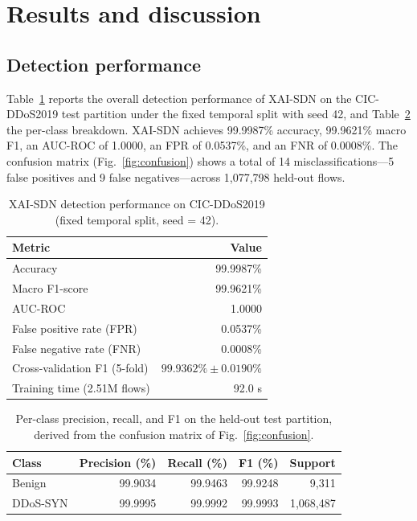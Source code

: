﻿\documentclass[review,12pt]{elsarticle}
\begin{document}
\section{Results and discussion}
\label{sec:results}

\subsection{Detection performance}
Table~\ref{tab:results} reports the overall detection performance of XAI-SDN on the CIC-DDoS2019 test partition under the fixed temporal split with seed 42, and Table~\ref{tab:perclass} the per-class breakdown. XAI-SDN achieves 99.9987\% accuracy, 99.9621\% macro F1, an AUC-ROC of 1.0000, an FPR of 0.0537\%, and an FNR of 0.0008\%. The confusion matrix (Fig.~\ref{fig:confusion}) shows a total of 14 misclassifications---5 false positives and 9 false negatives---across 1,077,798 held-out flows.

\begin{table}[!t]
\centering
\caption{XAI-SDN detection performance on CIC-DDoS2019 (fixed temporal split, seed = 42).}
\label{tab:results}
\begin{tabular}{@{}lr@{}}
\toprule
\textbf{Metric} & \textbf{Value} \\
\midrule
Accuracy & 99.9987\% \\
Macro F1-score & 99.9621\% \\
AUC-ROC & 1.0000 \\
False positive rate (FPR) & 0.0537\% \\
False negative rate (FNR) & 0.0008\% \\
Cross-validation F1 (5-fold) & $99.9362\% \pm 0.0190\%$ \\
Training time (2.51M flows) & 92.0 s \\
\bottomrule
\end{tabular}
\end{table}

\begin{table}[!t]
\centering
\caption{Per-class precision, recall, and F1 on the held-out test partition, derived from the confusion matrix of Fig.~\ref{fig:confusion}.}
\label{tab:perclass}
\small
\setlength{\tabcolsep}{4pt}
\begin{tabular}{@{}lrrrr@{}}
\toprule
\textbf{Class} & \textbf{Precision (\%)} & \textbf{Recall (\%)} & \textbf{F1 (\%)} & \textbf{Support} \\
\midrule
Benign & 99.9034 & 99.9463 & 99.9248 & 9,311 \\
DDoS-SYN & 99.9995 & 99.9992 & 99.9993 & 1,068,487 \\
\bottomrule
\end{tabular}
\end{table}
\end{document}
